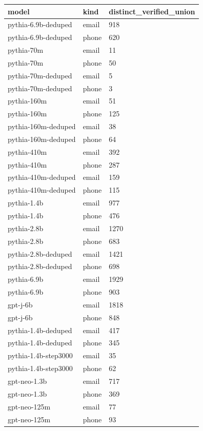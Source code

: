 \begin{tabular}{lll}
\toprule
model & kind & distinct\_verified\_union \\
\midrule
pythia-6.9b-deduped & email & 918 \\
pythia-6.9b-deduped & phone & 620 \\
pythia-70m & email & 11 \\
pythia-70m & phone & 50 \\
pythia-70m-deduped & email & 5 \\
pythia-70m-deduped & phone & 3 \\
pythia-160m & email & 51 \\
pythia-160m & phone & 125 \\
pythia-160m-deduped & email & 38 \\
pythia-160m-deduped & phone & 64 \\
pythia-410m & email & 392 \\
pythia-410m & phone & 287 \\
pythia-410m-deduped & email & 159 \\
pythia-410m-deduped & phone & 115 \\
pythia-1.4b & email & 977 \\
pythia-1.4b & phone & 476 \\
pythia-2.8b & email & 1270 \\
pythia-2.8b & phone & 683 \\
pythia-2.8b-deduped & email & 1421 \\
pythia-2.8b-deduped & phone & 698 \\
pythia-6.9b & email & 1929 \\
pythia-6.9b & phone & 903 \\
gpt-j-6b & email & 1818 \\
gpt-j-6b & phone & 848 \\
pythia-1.4b-deduped & email & 417 \\
pythia-1.4b-deduped & phone & 345 \\
pythia-1.4b-step3000 & email & 35 \\
pythia-1.4b-step3000 & phone & 62 \\
gpt-neo-1.3b & email & 717 \\
gpt-neo-1.3b & phone & 369 \\
gpt-neo-125m & email & 77 \\
gpt-neo-125m & phone & 93 \\
\bottomrule
\end{tabular}
